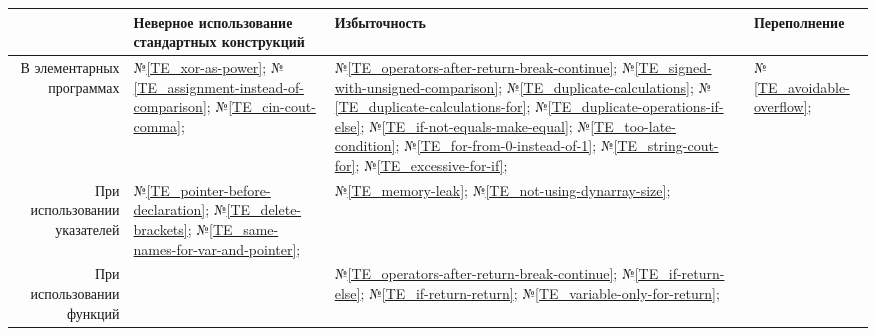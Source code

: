 \begin{center}
	\begin{tabular}{|r|m{4.5cm}|m{4cm}|m{4cm}|}\hline
		 & Неверное использование стандартных конструкций & Избыточность & Переполнение
		\\\hline
			В элементарных программах
		&
			№\ref{TE_xor-as-power};
			№\ref{TE_assignment-instead-of-comparison};
			№\ref{TE_cin-cout-comma};
		&
			№\ref{TE_operators-after-return-break-continue}; %
			№\ref{TE_signed-with-unsigned-comparison};
			№\ref{TE_duplicate-calculations};
			№\ref{TE_duplicate-calculations-for};
			№\ref{TE_duplicate-operations-if-else};
			№\ref{TE_if-not-equals-make-equal};
			№\ref{TE_too-late-condition};
			№\ref{TE_for-from-0-instead-of-1};
			№\ref{TE_string-cout-for};
			№\ref{TE_excessive-for-if};
		&
			№\ref{TE_avoidable-overflow};
		\\\hline
			При использовании указателей
		&
			№\ref{TE_pointer-before-declaration};
			№\ref{TE_delete-brackets};
			№\ref{TE_same-names-for-var-and-pointer};
		&
			№\ref{TE_memory-leak};
			№\ref{TE_not-using-dynarray-size};
		&
		\\\hline
		При использовании функций
		&
		&
			№\ref{TE_operators-after-return-break-continue}; %
			№\ref{TE_if-return-else};
			№\ref{TE_if-return-return};
			№\ref{TE_variable-only-for-return};
		&
		\\\hline
	\end{tabular}
\end{center}
